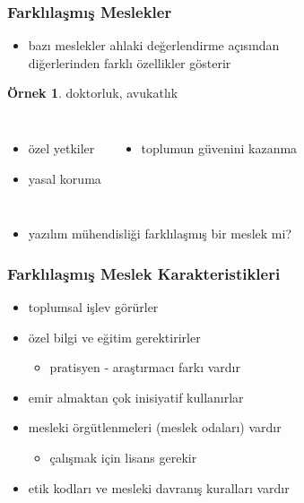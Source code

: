 \documentclass[dvipsnames]{beamer}
\theoremstyle{definition}
\theoremstyle{example}
\newtheorem{ornek}[theorem]{Örnek}
\theoremstyle{plain}
\begin{document}
\begin{frame}
  \frametitle{Farklılaşmış Meslekler}

  \begin{itemize}
    \item bazı meslekler ahlaki değerlendirme açısından\\
      diğerlerinden farklı özellikler gösterir
  \end{itemize}

  \begin{ornek}
    doktorluk, avukatlık
  \end{ornek}

  \pause
  \begin{columns}
    \begin{itemize}
      \item özel yetkiler
      \item yasal koruma
    \end{itemize}

    \begin{itemize}
      \item toplumun güvenini kazanma
    \end{itemize}
  \end{columns}

  \pause
  \bigskip
  \begin{itemize}
    \item yazılım mühendisliği farklılaşmış bir meslek mi?
  \end{itemize}
\end{frame}

\begin{frame}
  \frametitle{Farklılaşmış Meslek Karakteristikleri}

  \begin{itemize}
    \item toplumsal işlev görürler

    \pause
    \item özel bilgi ve eğitim gerektirirler
    \begin{itemize}
      \item pratisyen - araştırmacı farkı vardır
    \end{itemize}

    \pause
    \item emir almaktan çok inisiyatif kullanırlar

    \pause
    \item mesleki örgütlenmeleri (meslek odaları) vardır
    \begin{itemize}
      \item çalışmak için lisans gerekir
    \end{itemize}

    \pause
    \item etik kodları ve mesleki davranış kuralları vardır
  \end{itemize}
\end{frame}
\end{document}
